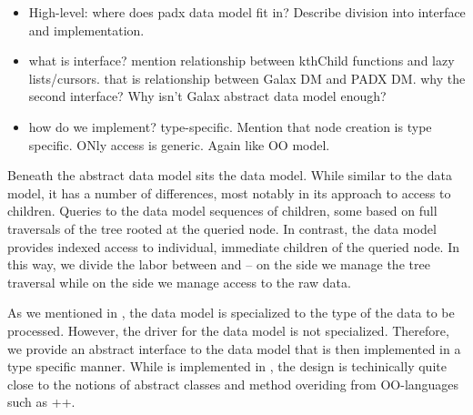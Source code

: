 





\begin{itemize}
\item High-level: where does padx data model fit in? Describe division
  into interface and implementation.
\item what is interface? mention relationship between kthChild
  functions and lazy lists/cursors. that is relationship between Galax
  DM and PADX DM.
  why the second interface? Why isn't Galax abstract data model enough?
\item how do we implement? type-specific. Mention that node creation
  is type specific. ONly access is generic. Again like OO model.
\end{itemize}

Beneath the \galax{} abstract data model sits the \padx{} data model.
While similar to the \galax{} data model, it has a number of
differences, most notably in its approach to access to children.
Queries to the \galax data model sequences of children, some based on
full traversals of the tree rooted at the queried node. In contrast,
the \padx{} data model provides indexed access to individual,
immediate children of the queried node. In this way, we divide the
labor between \galax{} and \pads{} -- on the \galax{} side we manage
the tree traversal while on the \pads{} side we manage access to the
raw data.

As we mentioned in , the \padx{} data model is
specialized to the type of the data to be processed. However, the
\galax{} driver for the data model is not specialized. Therefore, we
provide an abstract interface to the data model that is then
implemented in a type specific manner. While \padx{} is implemented in
\C{}, the design is techinically quite close to the notions of abstract classes
and method overiding from OO-languages such as \C++{}.

